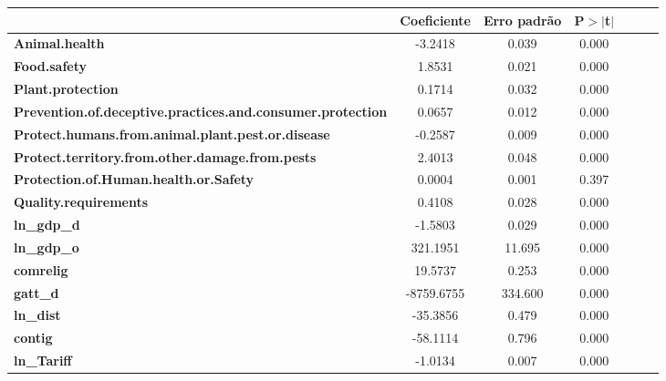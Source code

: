 \begin{center}
\begin{tabular}{lcccccc}
                                                                   & \textbf{Coeficiente} & \textbf{Erro padrão} &\textbf{P$> |$t$|$}\\
\midrule
\textbf{Animal.health}                                             &      -3.2418  &        0.039     &        0.000\\
\textbf{Food.safety}                                               &       1.8531  &        0.021     &        0.000\\
\textbf{Plant.protection}                                          &       0.1714  &        0.032     &        0.000\\
\textbf{Prevention.of.deceptive.practices.and.consumer.protection} &       0.0657  &        0.012     &        0.000\\
\textbf{Protect.humans.from.animal.plant.pest.or.disease}          &      -0.2587  &        0.009     &        0.000\\
\textbf{Protect.territory.from.other.damage.from.pests}            &       2.4013  &        0.048     &        0.000\\
\textbf{Protection.of.Human.health.or.Safety}                      &       0.0004  &        0.001     &        0.397\\
\textbf{Quality.requirements}                                      &       0.4108  &        0.028     &        0.000\\
\textbf{ln\_gdp\_d}                                                &      -1.5803  &        0.029     &        0.000\\
\textbf{ln\_gdp\_o}                                                &     321.1951  &       11.695     &        0.000\\
\textbf{comrelig}                                                  &      19.5737  &        0.253     &        0.000\\
\textbf{gatt\_d}                                                   &   -8759.6755  &      334.600     &        0.000\\
\textbf{ln\_dist}                                                  &     -35.3856  &        0.479     &        0.000\\
\textbf{contig}                                                    &     -58.1114  &        0.796     &        0.000\\
\textbf{ln\_Tariff}                                                &      -1.0134  &        0.007     &        0.000\\
\bottomrule
\end{tabular}
\end{center}